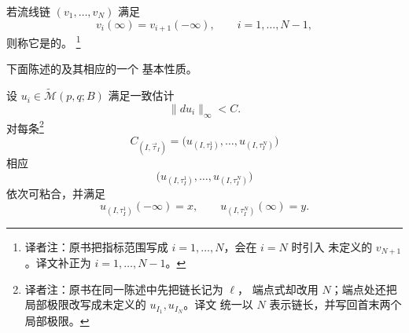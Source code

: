 \begin{definition}
\label{def:gluable-floer-chain}
若\personFloer{}流线链 $(v_1,\ldots,v_N)$ 满足
\[
  v_i(\infty)=v_{i+1}(-\infty),
  \qquad i=1,\ldots,N-1,
\]
则称它是\termGluable{}的。
\footnote{译者注：原书把指标范围写成 $i=1,\ldots,N$，会在 $i=N$ 时引入
未定义的 $v_{N+1}$。译文补正为 $i=1,\ldots,N-1$。}
\end{definition}

下面陈述\termRecoveringSequence{}的\termMaximalChain{}及其相应\termLocalLimit{}的一个
基本性质。

\begin{proposition}
\label{prop:maximal-chain-consecutively-gluable}
设 $u_i\in\widetilde{\mathcal M}(p,q;B)$ 满足一致估计
\[
  \|du_i\|_\infty<C.
\]
对每条\termMaximalChain{}\footnote{译者注：原书在同一陈述中先把链长记为 $\ell$，
端点式却改用 $N$；端点处还把局部极限改写成未定义的 $u_{I_1},u_{I_N}$。译文
统一以 $N$ 表示链长，并写回首末两个局部极限。}
\[
  C_{(I,\vec\tau_I)}
  =
  \bigl(
    u_{(I,\tau_I^1)},\ldots,u_{(I,\tau_I^N)}
  \bigr)
\]
相应\termLocalLimit{}
\[
  \bigl(
    u_{(I,\tau_I^1)},\ldots,u_{(I,\tau_I^N)}
  \bigr)
\]
依次可粘合，并满足
\[
  u_{(I,\tau_I^1)}(-\infty)=x,
  \qquad
  u_{(I,\tau_I^N)}(\infty)=y.
\]
\end{proposition}

